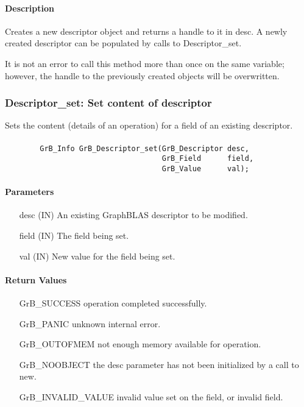 \paragraph{Description}

Creates a new descriptor object and returns a handle to it in {\sf desc}.
A newly created descriptor can be populated by calls to {\sf Descriptor\_set}.

It is not an error to call this method more than once on the same variable;  
however, the handle to the previously created objects will be overwritten. 


\subsubsection{{\sf Descriptor\_set}: Set content of descriptor}

Sets the content (details of an operation) for a field of an existing
descriptor.

\paragraph{\syntax}

\begin{verbatim}
        GrB_Info GrB_Descriptor_set(GrB_Descriptor desc,
                                    GrB_Field      field,
                                    GrB_Value      val);
\end{verbatim}

\paragraph{Parameters}

\begin{itemize}[leftmargin=1.1in]
    \item[{\sf desc}]  ({\sf IN}) An existing GraphBLAS descriptor to be modified.
    \item[{\sf field}] ({\sf IN}) The field being set.
    \item[{\sf val}]   ({\sf IN}) New value for the field being set.
\end{itemize}

\paragraph{Return Values}

\begin{itemize}[leftmargin=2.1in]
\item[{\sf GrB\_SUCCESS}]           operation completed successfully.
\item[{\sf GrB\_PANIC}]             unknown internal error.
\item[{\sf GrB\_OUTOFMEM}]          not enough memory available for operation.
\item[{\sf GrB\_NOOBJECT}]          the {\sf desc} parameter has not been
                                    initialized by a call to {\sf new}.
\item[{\sf GrB\_INVALID\_VALUE}]    invalid value set on the field, or invalid field.
\end{itemize}


